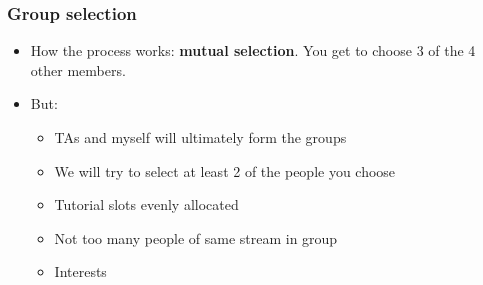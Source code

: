 \begin{frame}\frametitle{Group selection}
	\begin{itemize}
		\item	How the process works: \textbf{mutual selection}. You get to choose 3 of the 4 other members.
		\item	But:
		\begin{itemize}
			\item	TAs and myself will ultimately form the groups
			\item	We will try to select at least 2 of the people you choose
			\item	Tutorial slots evenly allocated
			\item	Not too many people of same stream in group
			\item	Interests
		\end{itemize}
	\end{itemize}
\end{frame}


